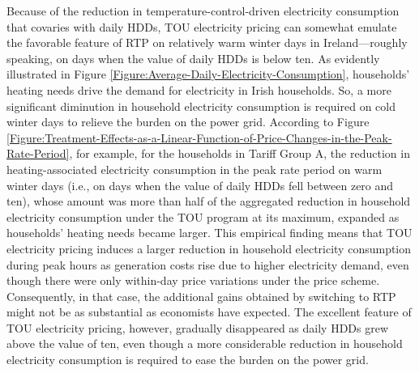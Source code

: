 Because of the reduction in temperature-control-driven electricity consumption that covaries with daily HDDs, TOU electricity pricing can somewhat emulate the favorable feature of RTP on relatively warm winter days in Ireland---roughly speaking, on days when the value of daily HDDs is below ten. As evidently illustrated in Figure \ref{Figure:Average-Daily-Electricity-Consumption}, households' heating needs drive the demand for electricity in Irish households. So, a more significant diminution in household electricity consumption is required on cold winter days to relieve the burden on the power grid. According to Figure \ref{Figure:Treatment-Effects-as-a-Linear-Function-of-Price-Changes-in-the-Peak-Rate-Period}, for example, for the households in Tariff Group A, the reduction in heating-associated electricity consumption in the peak rate period on warm winter days (i.e., on days when the value of daily HDDs fell between zero and ten), whose amount was more than half of the aggregated reduction in household electricity consumption under the TOU program at its maximum, expanded as households' heating needs became larger. This empirical finding means that TOU electricity pricing induces a larger reduction in household electricity consumption during peak hours as generation costs rise due to higher electricity demand, even though there were only within-day price variations under the price scheme. Consequently, in that case, the additional gains obtained by switching to RTP might not be as substantial as economists have expected. The excellent feature of TOU electricity pricing, however, gradually disappeared as daily HDDs grew above the value of ten, even though a more considerable reduction in household electricity consumption is required to ease the burden on the power grid. 
